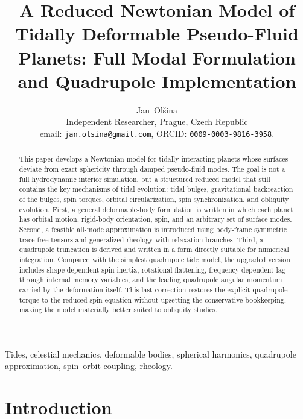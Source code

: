 \documentclass[journal, a4paper]{IEEEtran}
\begin{document}
\title{A Reduced Newtonian Model of Tidally Deformable Pseudo-Fluid Planets:
Full Modal Formulation and Quadrupole Implementation}

\author{Jan~Ol\v{s}ina\\[1ex] Independent Researcher, Prague, Czech Republic\\
email: \texttt{jan.olsina@gmail.com},  ORCID: \texttt{0009-0003-9816-3958}.}



\maketitle

\begin{abstract}
This paper develops a Newtonian model for tidally interacting planets whose
surfaces deviate from exact sphericity through damped pseudo-fluid modes.
The goal is not a full hydrodynamic interior simulation, but a structured
reduced model that still contains the key mechanisms of tidal evolution:
tidal bulges, gravitational backreaction of the bulges, spin torques,
orbital circularization, spin synchronization, and obliquity evolution.
First, a general deformable-body formulation is written in which each planet
has orbital motion, rigid-body orientation, spin, and an arbitrary set of
surface modes. Second, a feasible all-mode approximation is introduced using
body-frame symmetric trace-free tensors and generalized rheology with
relaxation branches. Third, a quadrupole truncation is derived and written
in a form directly suitable for numerical integration. Compared with the
simplest quadrupole tide model, the upgraded version includes
shape-dependent spin inertia, rotational flattening, frequency-dependent
lag through internal memory variables, and the leading quadrupole angular
momentum carried by the deformation itself. This last correction restores the
explicit quadrupole torque to the reduced spin equation without upsetting the
conservative bookkeeping, making the model materially better suited to
obliquity studies.
\end{abstract}

\begin{IEEEkeywords}
Tides, celestial mechanics, deformable bodies, spherical harmonics,
quadrupole approximation, spin--orbit coupling, rheology.
\end{IEEEkeywords}

\section{Introduction}
\end{document}
